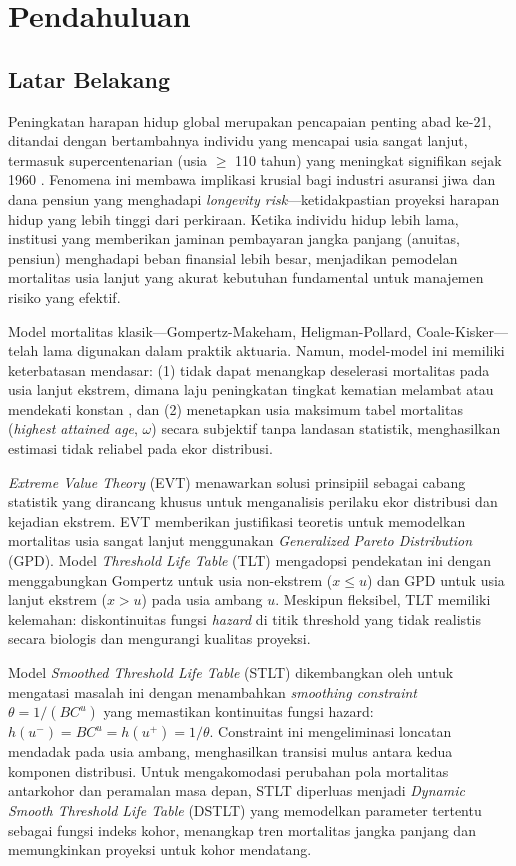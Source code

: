 \chapter{Pendahuluan}

\section{Latar Belakang}

Peningkatan harapan hidup global merupakan pencapaian penting abad ke-21, ditandai dengan bertambahnya individu yang mencapai usia sangat lanjut, termasuk supercentenarian (usia $\geq$ 110 tahun) yang meningkat signifikan sejak 1960 \citep{Young2021}. Fenomena ini membawa implikasi krusial bagi industri asuransi jiwa dan dana pensiun yang menghadapi \textit{longevity risk}—ketidakpastian proyeksi harapan hidup yang lebih tinggi dari perkiraan. Ketika individu hidup lebih lama, institusi yang memberikan jaminan pembayaran jangka panjang (anuitas, pensiun) menghadapi beban finansial lebih besar, menjadikan pemodelan mortalitas usia lanjut yang akurat kebutuhan fundamental untuk manajemen risiko yang efektif.

Model mortalitas klasik—Gompertz-Makeham, Heligman-Pollard, Coale-Kisker—telah lama digunakan dalam praktik aktuaria. Namun, model-model ini memiliki keterbatasan mendasar: (1) tidak dapat menangkap deselerasi mortalitas pada usia lanjut ekstrem, dimana laju peningkatan tingkat kematian melambat atau mendekati konstan \citep{Thatcher1999}, dan (2) menetapkan usia maksimum tabel mortalitas (\textit{highest attained age}, $\omega$) secara subjektif tanpa landasan statistik, menghasilkan estimasi tidak reliabel pada ekor distribusi.

\textit{Extreme Value Theory} (EVT) menawarkan solusi prinsipiil sebagai cabang statistik yang dirancang khusus untuk menganalisis perilaku ekor distribusi dan kejadian ekstrem. EVT memberikan justifikasi teoretis untuk memodelkan mortalitas usia sangat lanjut menggunakan \textit{Generalized Pareto Distribution} (GPD). Model \textit{Threshold Life Table} (TLT) mengadopsi pendekatan ini dengan menggabungkan Gompertz untuk usia non-ekstrem ($x \leq u$) dan GPD untuk usia lanjut ekstrem ($x > u$) pada usia ambang $u$. Meskipun fleksibel, TLT memiliki kelemahan: diskontinuitas fungsi \textit{hazard} di titik threshold yang tidak realistis secara biologis dan mengurangi kualitas proyeksi.

Model \textit{Smoothed Threshold Life Table} (STLT) dikembangkan oleh \citet{huang2020modelling} untuk mengatasi masalah ini dengan menambahkan \textit{smoothing constraint} $\theta = 1/(BC^u)$ yang memastikan kontinuitas fungsi hazard: $h(u^-) = BC^u = h(u^+) = 1/\theta$. Constraint ini mengeliminasi loncatan mendadak pada usia ambang, menghasilkan transisi mulus antara kedua komponen distribusi. Untuk mengakomodasi perubahan pola mortalitas antarkohor dan peramalan masa depan, STLT diperluas menjadi \textit{Dynamic Smooth Threshold Life Table} (DSTLT) yang memodelkan parameter tertentu sebagai fungsi indeks kohor, menangkap tren mortalitas jangka panjang dan memungkinkan proyeksi untuk kohor mendatang.

